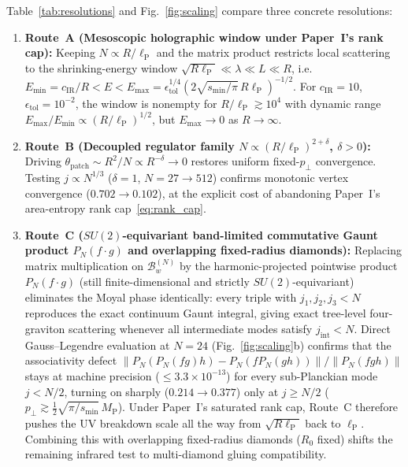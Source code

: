 \documentclass[11pt]{article}
\newcommand{\lP}{\ell_{\mathrm{P}}}
\newcommand{\calB}{\mathcal{B}}
\begin{document}
Table~\ref{tab:resolutions} and Fig.~\ref{fig:scaling} compare three concrete resolutions:
\begin{enumerate}
\item \textbf{Route~A (Mesoscopic holographic window under Paper~I's rank cap):} Keeping $N \propto R/\lP$ and the matrix product restricts local scattering to the shrinking-energy window $\sqrt{R\lP} \ll \lambda \ll L \ll R$, i.e. $E_{\min} = c_{\mathrm{IR}}/R < E < E_{\max} = \epsilon_{\mathrm{tol}}^{1/4}(2\sqrt{s_{\min}/\pi}\,R\lP)^{-1/2}$. For $c_{\mathrm{IR}}=10$, $\epsilon_{\mathrm{tol}}=10^{-2}$, the window is nonempty for $R/\lP \gtrsim 10^4$ with dynamic range $E_{\max}/E_{\min} \propto (R/\lP)^{1/2}$, but $E_{\max}\to 0$ as $R\to\infty$.
\item \textbf{Route~B (Decoupled regulator family $N \propto (R/\lP)^{2+\delta}$, $\delta > 0$):} Driving $\theta_{\mathrm{patch}} \sim R^2/N \propto R^{-\delta} \to 0$ restores uniform fixed-$p_\perp$ convergence. Testing $j \propto N^{1/3}$ ($\delta = 1$, $N = 27 \to 512$) confirms monotonic vertex convergence ($0.702 \to 0.102$), at the explicit cost of abandoning Paper~I's area-entropy rank cap~\eqref{eq:rank_cap}.
\item \textbf{Route~C ($SU(2)$-equivariant band-limited commutative Gaunt product $P_N(f\cdot g)$ and overlapping fixed-radius diamonds):} Replacing matrix multiplication on $\calB_w^{(N)}$ by the harmonic-projected pointwise product $P_N(f\cdot g)$ (still finite-dimensional and strictly $SU(2)$-equivariant) eliminates the Moyal phase identically: every triple with $j_1, j_2, j_3 < N$ reproduces the exact continuum Gaunt integral, giving exact tree-level four-graviton scattering whenever all intermediate modes satisfy $j_{\mathrm{int}} < N$. Direct Gauss--Legendre evaluation at $N=24$ (Fig.~\ref{fig:scaling}b) confirms that the associativity defect $\|P_N(P_N(fg)h) - P_N(fP_N(gh))\|/\|P_N(fgh)\|$ stays at machine precision ($\le 3.3\times 10^{-13}$) for every sub-Planckian mode $j < N/2$, turning on sharply ($0.214 \to 0.377$) only at $j \ge N/2$ ($p_\perp \gtrsim \frac{1}{2}\sqrt{\pi/s_{\min}}\,M_{\mathrm{P}}$). Under Paper~I's saturated rank cap, Route~C therefore pushes the UV breakdown scale all the way from $\sqrt{R\lP}$ back to $\lP$. Combining this with overlapping fixed-radius diamonds ($R_0$ fixed) shifts the remaining infrared test to multi-diamond gluing compatibility.
\end{enumerate}
\end{document}
